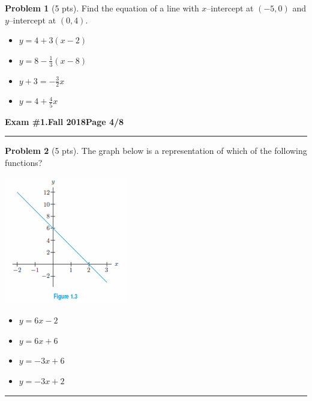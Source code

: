 \documentclass[12pt]{article}
\makeatletter
\theoremstyle{definition}
\newtheorem{problem}{Problem}
\newcommand*{\radiobutton}{%
  \@ifstar{\@radiobutton0}{\@radiobutton1}%
}
\newcommand*{\@radiobutton}[1]{%
  \begin{tikzpicture}
    \pgfmathsetlengthmacro\radius{height("X")/2}
    \draw[radius=\radius] circle;
    \ifcase#1 \fill[radius=.6*\radius] circle;\fi
  \end{tikzpicture}%
}
\makeatother
\begin{document}
\begin{problem}[5 pts]
  Find the equation of a line with $x$--intercept at $(-5,0)$ and $y$--intercept at $(0,4)$.
  \begin{itemize}
  \item[\radiobutton] $y=4+3(x-2)$
  \item[\radiobutton] $y=8-\tfrac{1}{3}(x-8)$
  \item[\radiobutton] $y+3=-\tfrac{3}{2}x$
  \item[\radiobutton] $y=4+\tfrac{4}{5}x$
  \end{itemize}
\end{problem}
\newpage

\hfill{\large\bf Exam \#1.}\hfill{\large\bf Fall 2018}\hfill{\large\bf Page 4/8}\hrule

\bigskip
\begin{problem}[5 pts]
  The graph below is a representation of which of the following functions?
  \begin{multicols}{2}
    \begin{center}
      \includegraphics{1graph2.png}
    \end{center}
    \begin{itemize}
    \item[\radiobutton] $y=6x-2$
    \item[\radiobutton] $y=6x+6$
    \item[\radiobutton] $y=-3x+6$
    \item[\radiobutton] $y=-3x+2$
    \end{itemize}
  \end{multicols}
\end{problem}
\hrule
\end{document}
